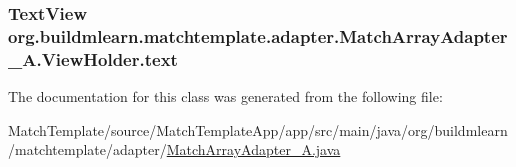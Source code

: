 \subsubsection[{\texorpdfstring{text}{text}}]{\setlength{\rightskip}{0pt plus 5cm}Text\+View org.\+buildmlearn.\+matchtemplate.\+adapter.\+Match\+Array\+Adapter\+\_\+\+A.\+View\+Holder.\+text}\hypertarget{classorg_1_1buildmlearn_1_1matchtemplate_1_1adapter_1_1MatchArrayAdapter__A_1_1ViewHolder_a42cec545e1c3db915dc48a759f8e758a}{}\label{classorg_1_1buildmlearn_1_1matchtemplate_1_1adapter_1_1MatchArrayAdapter__A_1_1ViewHolder_a42cec545e1c3db915dc48a759f8e758a}


The documentation for this class was generated from the following file\+:\begin{DoxyCompactItemize}
\item 
Match\+Template/source/\+Match\+Template\+App/app/src/main/java/org/buildmlearn/matchtemplate/adapter/\hyperlink{MatchArrayAdapter__A_8java}{Match\+Array\+Adapter\+\_\+\+A.\+java}\end{DoxyCompactItemize}
